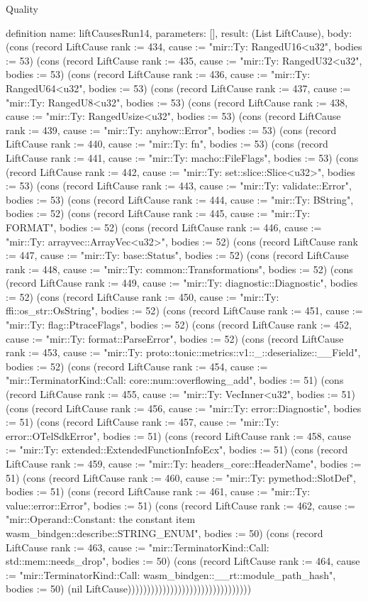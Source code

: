 \begin{lexlean}{Quality}
\begin{semanticmodule}
{}

definition{
  name: liftCausesRun14,
  parameters: [],
  result: (List LiftCause),
  body: (cons (record LiftCause {rank := 434, cause := "mir::Ty: RangedU16<u32", bodies := 53}) (cons (record LiftCause {rank := 435, cause := "mir::Ty: RangedU32<u32", bodies := 53}) (cons (record LiftCause {rank := 436, cause := "mir::Ty: RangedU64<u32", bodies := 53}) (cons (record LiftCause {rank := 437, cause := "mir::Ty: RangedU8<u32", bodies := 53}) (cons (record LiftCause {rank := 438, cause := "mir::Ty: RangedUsize<u32", bodies := 53}) (cons (record LiftCause {rank := 439, cause := "mir::Ty: anyhow::Error", bodies := 53}) (cons (record LiftCause {rank := 440, cause := "mir::Ty: fn", bodies := 53}) (cons (record LiftCause {rank := 441, cause := "mir::Ty: macho::FileFlags", bodies := 53}) (cons (record LiftCause {rank := 442, cause := "mir::Ty: set::slice::Slice<u32>", bodies := 53}) (cons (record LiftCause {rank := 443, cause := "mir::Ty: validate::Error", bodies := 53}) (cons (record LiftCause {rank := 444, cause := "mir::Ty: BString", bodies := 52}) (cons (record LiftCause {rank := 445, cause := "mir::Ty: FORMAT", bodies := 52}) (cons (record LiftCause {rank := 446, cause := "mir::Ty: arrayvec::ArrayVec<u32>", bodies := 52}) (cons (record LiftCause {rank := 447, cause := "mir::Ty: base::Status", bodies := 52}) (cons (record LiftCause {rank := 448, cause := "mir::Ty: common::Transformations", bodies := 52}) (cons (record LiftCause {rank := 449, cause := "mir::Ty: diagnostic::Diagnostic", bodies := 52}) (cons (record LiftCause {rank := 450, cause := "mir::Ty: ffi::os_str::OsString", bodies := 52}) (cons (record LiftCause {rank := 451, cause := "mir::Ty: flag::PtraceFlags", bodies := 52}) (cons (record LiftCause {rank := 452, cause := "mir::Ty: format::ParseError", bodies := 52}) (cons (record LiftCause {rank := 453, cause := "mir::Ty: proto::tonic::metrics::v1::_::deserialize::__Field", bodies := 52}) (cons (record LiftCause {rank := 454, cause := "mir::TerminatorKind::Call: core::num::overflowing_add", bodies := 51}) (cons (record LiftCause {rank := 455, cause := "mir::Ty: VecInner<u32", bodies := 51}) (cons (record LiftCause {rank := 456, cause := "mir::Ty: error::Diagnostic", bodies := 51}) (cons (record LiftCause {rank := 457, cause := "mir::Ty: error::OTelSdkError", bodies := 51}) (cons (record LiftCause {rank := 458, cause := "mir::Ty: extended::ExtendedFunctionInfoEcx", bodies := 51}) (cons (record LiftCause {rank := 459, cause := "mir::Ty: headers_core::HeaderName", bodies := 51}) (cons (record LiftCause {rank := 460, cause := "mir::Ty: pymethod::SlotDef", bodies := 51}) (cons (record LiftCause {rank := 461, cause := "mir::Ty: value::error::Error", bodies := 51}) (cons (record LiftCause {rank := 462, cause := "mir::Operand::Constant: the constant item wasm_bindgen::describe::STRING_ENUM", bodies := 50}) (cons (record LiftCause {rank := 463, cause := "mir::TerminatorKind::Call: std::mem::needs_drop", bodies := 50}) (cons (record LiftCause {rank := 464, cause := "mir::TerminatorKind::Call: wasm_bindgen::__rt::module_path_hash", bodies := 50}) (nil LiftCause))))))))))))))))))))))))))))))))
}


\end{semanticmodule}
\end{lexlean}
